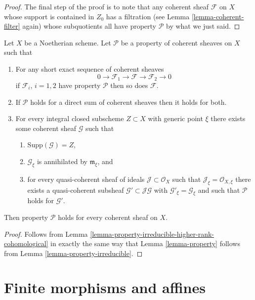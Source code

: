 \begin{proof}
\medskip\noindent
The final step of the proof is to note that any coherent sheaf
$\mathcal{F}$ on $X$ whose support is contained in $Z_0$ has a filtration
(see Lemma \ref{lemma-coherent-filter} again) whose subquotients
all have property $\mathcal{P}$ by what we just said.
\end{proof}

\begin{lemma}
\label{lemma-property-higher-rank-cohomological}
Let $X$ be a Noetherian scheme.
Let $\mathcal{P}$ be a property of coherent sheaves on $X$ such that
\begin{enumerate}
\item For any short exact sequence of coherent sheaves
$$
0 \to \mathcal{F}_1 \to \mathcal{F} \to \mathcal{F}_2 \to 0
$$
if $\mathcal{F}_i$, $i = 1, 2$ have property $\mathcal{P}$
then so does $\mathcal{F}$.
\item If $\mathcal{P}$ holds for a direct sum of coherent sheaves
then it holds for both.
\item For every integral closed subscheme $Z \subset X$
with generic point $\xi$ there exists
some coherent sheaf $\mathcal{G}$ such that
\begin{enumerate}
\item $\text{Supp}(\mathcal{G}) = Z$,
\item $\mathcal{G}_\xi$ is annihilated by $\mathfrak m_\xi$, and
\item for every quasi-coherent sheaf of ideals
$\mathcal{J} \subset \mathcal{O}_X$ such that
$\mathcal{J}_\xi = \mathcal{O}_{X, \xi}$ there exists a quasi-coherent
subsheaf $\mathcal{G}' \subset \mathcal{J}\mathcal{G}$ with
$\mathcal{G}'_\xi = \mathcal{G}_\xi$ and such that
$\mathcal{P}$ holds for $\mathcal{G}'$.
\end{enumerate}
\end{enumerate}
Then property $\mathcal{P}$ holds for every coherent sheaf
on $X$.
\end{lemma}

\begin{proof}
Follows from Lemma \ref{lemma-property-irreducible-higher-rank-cohomological}
in exactly the same way that Lemma \ref{lemma-property} follows from
Lemma \ref{lemma-property-irreducible}.
\end{proof}








\section{Finite morphisms and affines}
\label{section-finite-affine}

